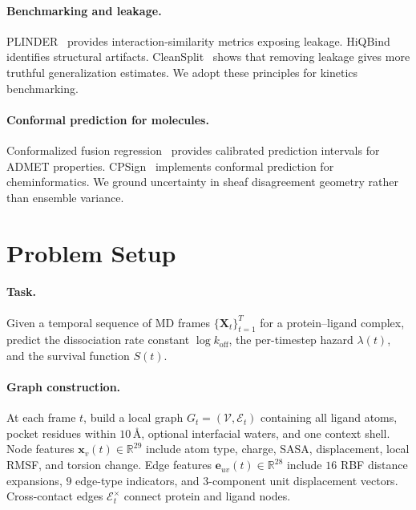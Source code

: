 \documentclass{article}
\begin{document}
\paragraph{Benchmarking and leakage.}
PLINDER~\citep{durairaj2024plinder} provides interaction-similarity
metrics exposing leakage.
HiQBind~\citep{wang2025hiqbind} identifies structural artifacts.
CleanSplit~\citep{li2025cleansplit} shows that removing leakage gives
more truthful generalization estimates.
We adopt these principles for kinetics benchmarking.

\paragraph{Conformal prediction for molecules.}
Conformalized fusion regression~\citep{huang2024cfr} provides
calibrated prediction intervals for ADMET properties.
CPSign~\citep{arvidsson2024cpsign} implements conformal prediction for
cheminformatics.
We ground uncertainty in sheaf disagreement geometry rather than
ensemble variance.

\section{Problem Setup}
\label{sec:setup}

\paragraph{Task.}
Given a temporal sequence of MD frames
$\{\mathbf{X}_t\}_{t=1}^{T}$ for a protein--ligand complex, predict
the dissociation rate constant $\log k_\text{off}$, the per-timestep
hazard $\lambda(t)$, and the survival function $S(t)$.

\paragraph{Graph construction.}
At each frame $t$, build a local graph
$G_t{=}(\mathcal{V},\mathcal{E}_t)$ containing all ligand atoms,
pocket residues within $10\,$\AA, optional interfacial waters, and
one context shell.  Node features $\mathbf{x}_v(t) \in \mathbb{R}^{29}$
include atom type, charge, SASA, displacement, local RMSF, and torsion
change.  Edge features $\mathbf{e}_{uv}(t) \in \mathbb{R}^{28}$
include $16$ RBF distance expansions, $9$ edge-type indicators, and
$3$-component unit displacement vectors.  Cross-contact edges
$\mathcal{E}^\times_t$ connect protein and ligand nodes.
\end{document}
